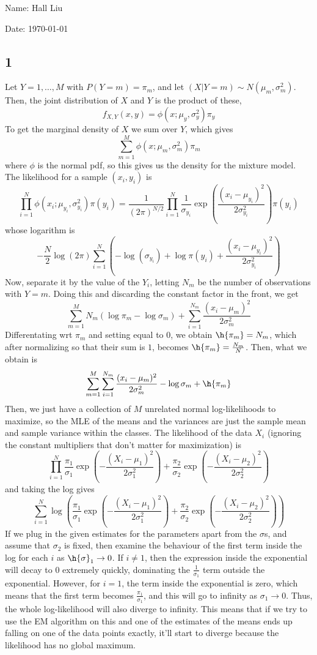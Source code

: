 \documentclass{article}
\begin{document}
Name: Hall Liu

Date: \today 
\vspace{1.5cm}
\subsection*{1}
Let $Y=1,\ldots,M$ with $P(Y=m)=\pi_m$, and let $(X|Y=m)\sim N(\mu_m, \sigma_m^2)$. Then, the joint distribution of $X$ and $Y$ is the product of these,
\[f_{X,Y}(x,y)=\phi(x;\mu_y,\sigma_y^2)\pi_y\]
To get the marginal density of $X$ we sum over $Y$, which gives
\[\sum_{m=1}^M\phi(x;\mu_m,\sigma_m^2)\pi_m\]
where $\phi$ is the normal pdf, so this gives us the density for the mixture model.
The likelihood for a sample $(x_i,y_i)$ is 
\[\prod_{i=1}^N\phi(x_i;\mu_{y_i}, \sigma_{y_i}^2)\pi(y_i)=\frac{1}{(2\pi)^{N/2}}\prod_{i=1}^N\frac{1}{\sigma_{y_i}}\exp\left(\frac{(x_i-\mu_{y_i})^2}{2\sigma_{y_i}^2}\right)\pi(y_i)\]
whose logarithm is 
\[-\frac{N}{2}\log(2\pi)\sum_{i=1}^N\left(-\log(\sigma_{y_i})+\log\pi(y_i)+\frac{(x_i-\mu_{y_i})^2}{2\sigma_{y_i}^2}\right)\]
Now, separate it by the value of the $Y_i$, letting $N_m$ be the number of observations with $Y=m$. Doing this and discarding the constant factor in the front, we get
\[\sum_{m=1}^MN_m\left(\log\pi_m-\log\sigma_m\right)+\sum_{i=1}^{N_m}\frac{(x_i-\mu_m)^2}{2\sigma_m^2}\]
Differentating wrt $\pi_m$ and setting equal to $0$, we obtain $\h{\pi_m}=N_m$, which after normalizing so that their sum is $1$, becomes $\h{\pi_m}=\frac{N_m}{N}$. Then, what we obtain is
\[\sum_{m=1}^M\sum_{i=1}^{N_m}\frac{(x_i-\mu_m)^2}{2\sigma_m^2}-\log\sigma_m+\h{\pi_m}\]
Then, we just have a collection of $M$ unrelated normal log-likelihoods to maximize, so the MLE of the means and the variances are just the sample mean and sample variance within the classes.
The likelihood of the data $X_i$ (ignoring the constant multipliers that don't matter for maximization) is
\[\prod_{i=1}^N\frac{\pi_1}{\sigma_1}\exp\left(-\frac{(X_i-\mu_1)^2}{2\sigma_1^2}\right)+\frac{\pi_2}{\sigma_2}\exp\left(-\frac{(X_i-\mu_2)^2}{2\sigma_2^2}\right)\]
and taking the log gives
\[\sum_{i=1}^N\log\left(\frac{\pi_1}{\sigma_1}\exp\left(-\frac{(X_i-\mu_1)^2}{2\sigma_1^2}\right)+\frac{\pi_2}{\sigma_2}\exp\left(-\frac{(X_i-\mu_2)^2}{2\sigma_2^2}\right)\right)\]
If we plug in the given estimates for the parameters apart from the $\sigma$s, and assume that $\sigma_2$ is fixed, then examine the behaviour of the first term inside the log for each $i$ as $\h{\sigma}_1\to0$. If $i\neq1$, then the expression inside the exponential will decay to $0$ extremely quickly, dominating the $\frac{1}{\sigma_1}$ term outside the exponential. However, for $i=1$, the term inside the exponential is zero, which means that the first term becomes $\frac{\pi_1}{\sigma_1}$, and this will go to infinity as $\sigma_1\to0$. Thus, the whole log-likelihood will also diverge to infinity. This means that if we try to use the EM algorithm on this and one of the estimates of the means ends up falling on one of the data points exactly, it'll start to diverge because the likelihood has no global maximum.
\end{document}
